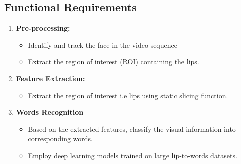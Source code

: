 \subsection{Functional Requirements}
\begin{enumerate}
\item \textbf{Pre-processing:}
\begin{itemize}
\item Identify and track the face in the video sequence
\item Extract the region of interest (ROI) containing the lips.
 

\end{itemize}
\item  \textbf{Feature Extraction:}
\begin{itemize}
\item Extract the region of interest i.e lips using static slicing function.



\end{itemize}
\item \textbf{Words Recognition}
\begin{itemize}
\item Based on the extracted features, classify the visual information into corresponding words.
\item Employ deep learning models trained on large lip-to-words datasets.




\end{itemize}


\end{enumerate}
